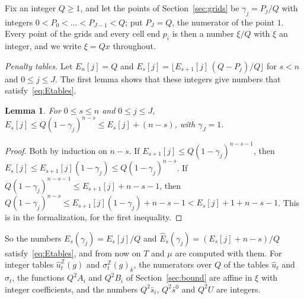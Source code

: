\documentclass[11pt]{amsart}
\newtheorem{lemma}[theorem]{Lemma}
\theoremstyle{definition}
\numberwithin{equation}{section}
\newcommand{\lean}[1]{\ignorespaces}
\begin{document}
Fix an integer $Q\ge1$, and let the points of Section~\ref{sec:grids} be $\gamma_j=P_j/Q$ with integers $0<P_0<\dots<P_{J-1}<Q$; put $P_J=Q$, the numerator of the point $1$. Every point of the grids and every cell end $p_i$ is then a number $\xi/Q$ with $\xi$ an integer, and we write $\xi=Qx$ throughout.

\emph{Penalty tables.} Let $E_n[j]=Q$ and $E_s[j]=\lfloor E_{s+1}[j]\,(Q-P_j)/Q\rfloor$ for $s<n$ and $0\le j\le J$. The first lemma shows that these integers give numbers that satisfy~\eqref{eq:Etables}.

\begin{lemma}\label{lem:Epen}\lean{Robbins.Cert.SO.Epen_le, Robbins.Cert.SO.le_Epen_add}
For $0\le s\le n$ and $0\le j\le J$, $E_s[j]\le Q(1-\gamma_j)^{n-s}\le E_s[j]+(n-s)$, with $\gamma_J=1$.
\end{lemma}

\begin{proof}
Both by induction on $n-s$. If $E_{s+1}[j]\le Q(1-\gamma_j)^{n-s-1}$, then $E_s[j]\le E_{s+1}[j](1-\gamma_j)\le Q(1-\gamma_j)^{n-s}$. If $Q(1-\gamma_j)^{n-s-1}\le E_{s+1}[j]+n-s-1$, then $Q(1-\gamma_j)^{n-s}\le E_{s+1}[j](1-\gamma_j)+n-s-1<E_s[j]+1+n-s-1$. This is  in the formalization, for the first inequality.
\end{proof}

So the numbers $E_s(\gamma_j)=E_s[j]/Q$ and $\hat E_s(\gamma_j)=(E_s[j]+n-s)/Q$ satisfy~\eqref{eq:Etables}, and from now on $T$ and $\mu$ are computed with them. For integer tables $\hat u^{\mathbb Z}_t(g)$ and $\sigma^{\mathbb Z}_t(g)_k$, the numerators over $Q$ of the tables $\hat u_t$ and $\sigma_t$, the functions $Q^2A_i$ and $Q^2B_i$ of Section~\ref{sec:bound} are affine in $\xi$ with integer coefficients, and the numbers $Q^2\bar s_i$, $Q^2\bar s^0$ and $Q^2U$ are integers.
\end{document}
